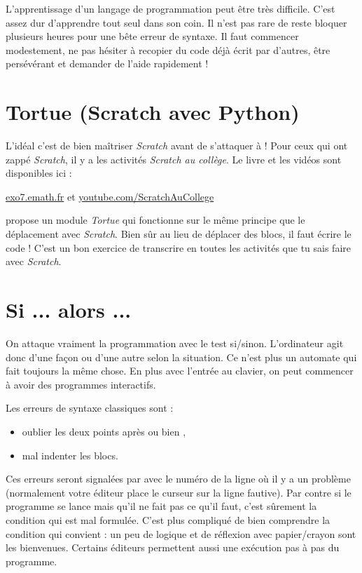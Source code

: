 \documentclass[11pt,class=report,crop=false]{standalone}
\begin{document}
L'apprentissage d'un langage de programmation peut être très difficile. C'est assez dur d'apprendre tout seul dans son coin. Il n'est pas rare de reste bloquer plusieurs heures pour une bête erreur de syntaxe. Il faut commencer modestement, ne pas hésiter à recopier du code déjà écrit par d'autres, être persévérant et demander de l'aide rapidement !


\section{Tortue (Scratch avec Python)}

L'idéal c'est de bien maîtriser \emph{Scratch} avant de s'attaquer à \Python{} !
Pour ceux qui ont zappé \emph{Scratch}, il y a les activités \emph{Scratch au collège}. Le livre et les vidéos sont disponibles ici :\\
\centerline{
\href{http://exo7.emath.fr/}{exo7.emath.fr} \qquad et \qquad  
\href{https://www.youtube.com/ScratchAuCollege}{youtube.com/ScratchAuCollege}
}

\Python{} propose un module \emph{Tortue} qui fonctionne sur le même principe que le déplacement avec \emph{Scratch}.
Bien sûr au lieu de déplacer des blocs, il faut écrire le code !
C'est un bon exercice de transcrire en \Python{} toutes les activités que tu sais faire avec \emph{Scratch}.


\section{Si ... alors ...}

On attaque vraiment la programmation avec le test \og{}si/sinon\fg{}.
L'ordinateur agit donc d'une façon ou d'une autre selon la situation. Ce n'est plus un automate qui fait toujours la même chose. En plus avec l'entrée au clavier, on peut commencer à avoir des programmes interactifs.

Les erreurs de syntaxe classiques sont :
\begin{itemize}
  \item oublier les deux points après  ou bien ,
  \item mal indenter les blocs.
\end{itemize}
Ces erreurs seront signalées par \Python{} avec le numéro de la ligne où il y a un problème (normalement votre éditeur place le curseur sur la ligne fautive).
Par contre si le programme se lance mais qu'il ne fait pas ce qu'il faut, c'est sûrement la condition qui est mal formulée. C'est plus compliqué de bien comprendre la condition qui convient : un peu de logique et de réflexion avec papier/crayon sont les bienvenues. 
Certains éditeurs \Python{} permettent aussi une exécution \og{}pas à pas\fg{} du programme.
\end{document}
